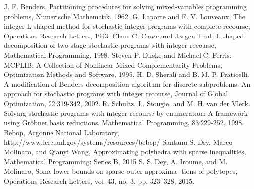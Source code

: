 \begin{thebibliography}{9}
    J. F. Benders, Partitioning procedures for solving mixed-variables programming problems, Numerische Mathematik, 1962.
	G. Laporte and F. V. Louveaux, The integer L-shaped method for stochastic integer programs with complete recourse, Operations Research Letters, 1993.
	Claus C. Car\o e and J\o rgen Tind, L-shaped decomposition of two-stage stochastic programs with integer recourse, Mathematical Programming, 1998.
	Steven P. Dirske and Michael C. Ferris, MCPLIB: A Collection of Nonlinear Mixed Complementarity Problems, Optimization Methods and Software, 1995.
	H. D. Sherali and B. M. P. Fraticelli. A modification of Benders decomposition algorithm for discrete subproblems: An approach for stochastic programs with integer recourse, Journal of Global Optimization, 22:319-342, 2002.
	R. Schultz, L. Stougie, and M. H. van der Vlerk. Solving stochastic programs with integer recourse by enumeration: A framework using Gröbner basis reductions. Mathematical Programming, 83:229-252, 1998.
	Bebop, Argonne National Laboratory, http://www.lcrc.anl.gov/systems/resources/bebop/
	Santanu S. Dey, Marco Molinaro, and Qianyi Wang, Approximating polyhedra with sparse inequalities, Mathematical Programming: Series B, 2015
	S. S. Dey, A. Iroume, and M. Molinaro, Some lower bounds on sparse outer approxima- tions of polytopes, Operations Research Letters, vol. 43, no. 3, pp. 323–328, 2015.
\end{thebibliography}